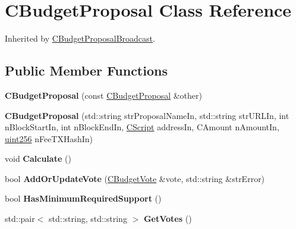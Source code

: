 \hypertarget{class_c_budget_proposal}{}\section{C\+Budget\+Proposal Class Reference}
\label{class_c_budget_proposal}


Inherited by \mbox{\hyperlink{class_c_budget_proposal_broadcast}{C\+Budget\+Proposal\+Broadcast}}.

\subsection*{Public Member Functions}
\begin{DoxyCompactItemize}
\item 
\mbox{\label{class_c_budget_proposal_a82ffaf35b2494a9e499aa59df44be56d}} 
{\bfseries C\+Budget\+Proposal} (const \mbox{\hyperlink{class_c_budget_proposal}{C\+Budget\+Proposal}} \&other)
\item 
\mbox{\label{class_c_budget_proposal_a28933edb02cfe0eec39fc0b2427cbcae}} 
{\bfseries C\+Budget\+Proposal} (std\+::string str\+Proposal\+Name\+In, std\+::string str\+U\+R\+L\+In, int n\+Block\+Start\+In, int n\+Block\+End\+In, \mbox{\hyperlink{class_c_script}{C\+Script}} address\+In, C\+Amount n\+Amount\+In, \mbox{\hyperlink{classuint256}{uint256}} n\+Fee\+T\+X\+Hash\+In)
\item 
\mbox{\label{class_c_budget_proposal_a62e5e004af90cfce33eddef90dcdb7e2}} 
void {\bfseries Calculate} ()
\item 
\mbox{\label{class_c_budget_proposal_ad153df04aa541d0c06eb068d79d0cf96}} 
bool {\bfseries Add\+Or\+Update\+Vote} (\mbox{\hyperlink{class_c_budget_vote}{C\+Budget\+Vote}} \&vote, std\+::string \&str\+Error)
\item 
\mbox{\label{class_c_budget_proposal_a839252a583d69a6d4301aa613fceab14}} 
bool {\bfseries Has\+Minimum\+Required\+Support} ()
\item 
\mbox{\label{class_c_budget_proposal_a60b112e2960d824dfcc8bc78414c09cc}} 
std\+::pair$<$ std\+::string, std\+::string $>$ {\bfseries Get\+Votes} ()

\end{DoxyCompactItemize}
